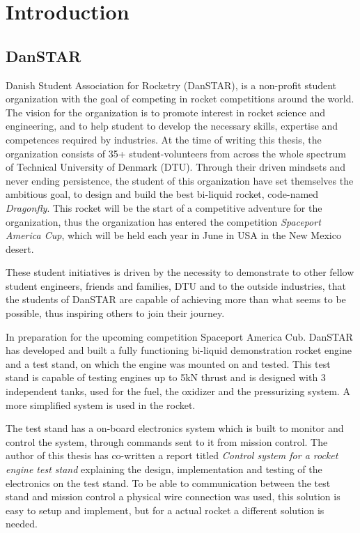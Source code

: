 \chapter{Introduction}

\section{DanSTAR}
Danish Student Association for Rocketry (DanSTAR)\cite{DanSTAR}, is a non-profit student organization with the goal of competing in rocket competitions around the world. The vision for the organization is to promote interest in rocket science and engineering, and to help student to develop the necessary skills, expertise and competences required by industries. At the time of writing this thesis, the organization consists of 35+ student-volunteers from across the whole spectrum of Technical University of Denmark (DTU). Through their driven mindsets and never ending persistence, the student of this organization have set themselves the ambitious goal, to design and build the best bi-liquid rocket, code-named \textit{Dragonfly}. This rocket will be the start of a competitive adventure for the organization, thus the organization has entered the competition \textit{Spaceport America Cup}, which will be held each year in June in USA in the New Mexico desert. 

These student initiatives is driven by the necessity to demonstrate to other fellow student engineers, friends and families, DTU and to the outside industries, that the students of DanSTAR are capable of achieving more than what seems to be possible, thus inspiring others to join their journey.  

In preparation for the upcoming competition Spaceport America Cub. DanSTAR has developed and built a fully functioning bi-liquid demonstration rocket engine and a test stand, on which the engine was mounted on and tested. This test stand is capable of testing engines up to 5kN thrust and is designed with 3 independent tanks, used for the fuel, the oxidizer and the pressurizing system. A more simplified system is used in the rocket.  

The test stand has a on-board electronics system which is built to monitor and control the system, through commands sent to it from mission control. The author of this thesis has co-written a report titled \textit{Control system for a rocket engine test stand} explaining the design, implementation and testing of the electronics on the test stand.\cite{DanSTAR_test_stand} To be able to communication between the test stand and mission control a physical wire connection was used, this solution is easy to setup and implement, but for a actual rocket a different solution is needed.

